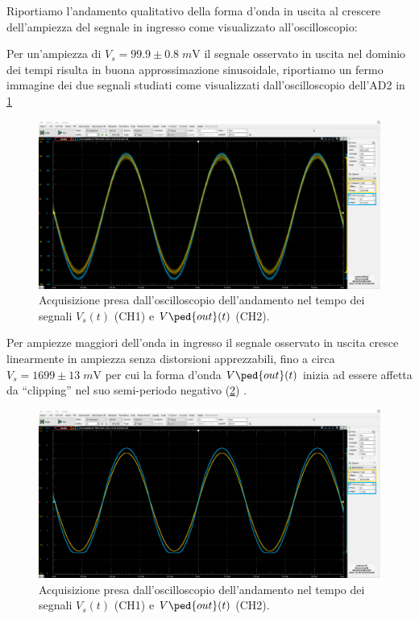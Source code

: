 \documentclass[10pt, a4paper, italian]{article}
\begin{document}
Riportiamo l'andamento qualitativo della forma d'onda in uscita al crescere
dell'ampiezza del segnale in ingresso come visualizzato all'oscilloscopio:

Per un'ampiezza di $V_s = 99.9 \pm 0.8 \; \si{m\V}$ il segnale osservato in
uscita nel dominio dei tempi risulta in buona approssimazione sinusoidale,
riportiamo un fermo immagine dei due segnali studiati come visualizzati
dall'oscilloscopio dell'AD2 in \cref{fig: aloop0.1}
\begin{figure}[htbp]
	\centering
	\includegraphics[scale=0.335]{Aloop100mV}
	\caption{Acquisizione presa dall'oscilloscopio dell'andamento nel tempo dei
	segnali $V_s (t)$ (CH1) e $V\ped{out} (t)$ (CH2). \label{fig: aloop0.1}}
\end{figure}

Per ampiezze maggiori dell'onda in ingresso il segnale osservato in uscita
cresce linearmente in ampiezza senza distorsioni apprezzabili, fino a circa
$V_s = 1699 \pm 13 \; \si{m\V}$ per cui la forma d'onda $V\ped{out} (t)$
inizia ad essere affetta da ``clipping'' nel suo semi-periodo negativo
(\cref{fig: aloop1.7}) .
\begin{figure}[htbp]
	\centering
	\includegraphics[scale=0.335]{Aloop1.7V}
	\caption{Acquisizione presa dall'oscilloscopio dell'andamento nel tempo dei
	segnali $V_s (t)$ (CH1) e $V\ped{out} (t)$ (CH2). \label{fig: aloop1.7}}
\end{figure}
\end{document}
